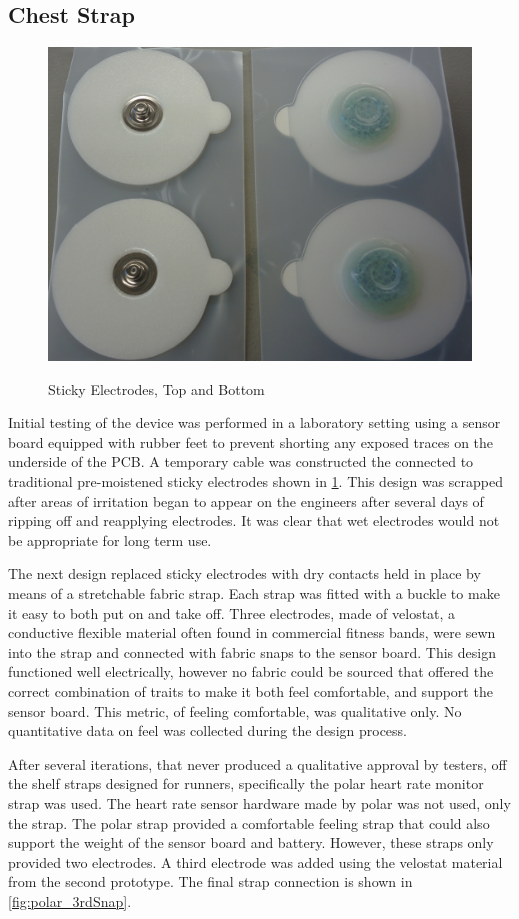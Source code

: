 \subsection {Chest Strap}
\begin{figure}[ht]
\begin{center}
	\label{fig:Electrodes}
	\includegraphics[angle=0,scale=1,width=.5\textwidth]{Images/Electrodes.png} 
	\caption{Sticky Electrodes, Top and Bottom}
\end{center}
\end{figure}
Initial testing of the device was performed in a laboratory setting using a sensor board equipped with rubber feet to prevent shorting any exposed traces on the underside of the PCB. A temporary cable was constructed the connected to traditional pre-moistened sticky electrodes shown in \cref{fig:Electrodes}. This design was scrapped after areas of irritation began to appear on the engineers after several days of ripping off and reapplying electrodes. It was clear that wet electrodes would not be appropriate for long term use.

The next design replaced sticky electrodes with dry contacts held in place by means of a stretchable fabric strap. Each strap was fitted with a buckle to make it easy to both put on and take off. Three electrodes, made of velostat, a conductive flexible material often found in commercial fitness bands, were sewn into the strap and connected with fabric snaps to the sensor board. This design functioned well electrically, however no fabric could be sourced that offered the correct combination of traits to make it both feel comfortable, and support the sensor board. This metric, of feeling comfortable, was qualitative only. No quantitative data on feel was collected during the design process.

After several iterations, that never produced a qualitative approval by testers, off the shelf straps designed for runners, specifically the polar heart rate monitor strap was used. The heart rate sensor hardware made by polar was not used, only the strap. The polar strap provided a comfortable feeling strap that could also support the weight of the sensor board and battery. However, these straps only provided two electrodes. A third electrode was added using the velostat material from the second prototype. The final strap connection is shown in \cref{fig:polar_3rdSnap}.

